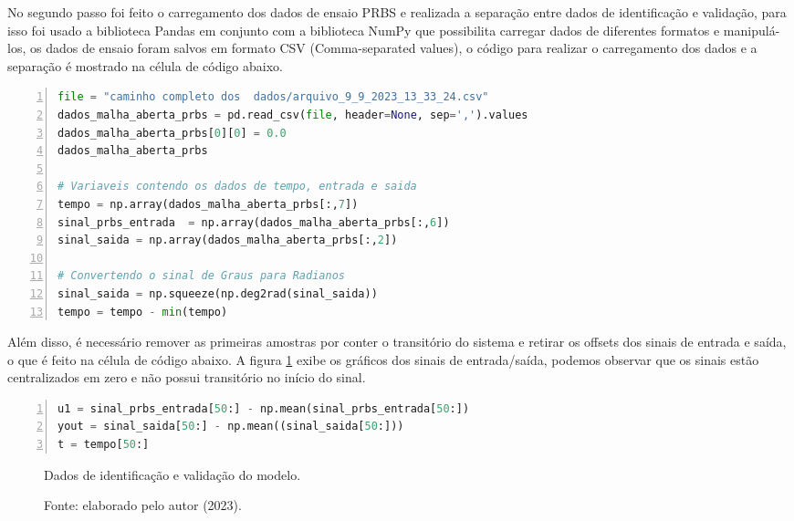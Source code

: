 No segundo passo foi feito o carregamento dos dados de ensaio PRBS e realizada a separação entre dados de identificação e validação, para isso foi usado a biblioteca Pandas em conjunto com a biblioteca NumPy que possibilita carregar dados de diferentes formatos e manipulá-los, os dados de ensaio foram salvos em formato CSV (Comma-separated values), o código para realizar o carregamento dos dados e a separação é mostrado na célula de código abaixo.

\vspace{0.5cm}

\begin{lstlisting}[language=python, numbers=left, label=py4, caption={Carregando os dados do ensaio e realizando pré-processamento.}]
file = "caminho completo dos  dados/arquivo_9_9_2023_13_33_24.csv"
dados_malha_aberta_prbs = pd.read_csv(file, header=None, sep=',').values
dados_malha_aberta_prbs[0][0] = 0.0
dados_malha_aberta_prbs

# Variaveis contendo os dados de tempo, entrada e saida
tempo = np.array(dados_malha_aberta_prbs[:,7])
sinal_prbs_entrada  = np.array(dados_malha_aberta_prbs[:,6])
sinal_saida = np.array(dados_malha_aberta_prbs[:,2])

# Convertendo o sinal de Graus para Radianos
sinal_saida = np.squeeze(np.deg2rad(sinal_saida))
tempo = tempo - min(tempo)
\end{lstlisting}


Além disso, é necessário remover as primeiras amostras por conter o transitório do sistema e retirar os offsets dos sinais de entrada e saída, o que é feito na célula de código abaixo. A figura \ref{fig3:image_20} exibe os gráficos dos sinais de entrada/saída, podemos observar que os sinais estão centralizados em zero e não possui transitório no início do sinal.

\vspace{0.5cm}


\begin{lstlisting}[language=python, numbers=left, label=py3, caption={Centralizando os sinais de entrada e daída em zero.}]
u1 = sinal_prbs_entrada[50:] - np.mean(sinal_prbs_entrada[50:])
yout = sinal_saida[50:] - np.mean((sinal_saida[50:]))
t = tempo[50:]
\end{lstlisting}

\begin{figure}[!h]
	\centering
	\caption{Dados de identificação e validação do modelo.}
	\caption*{Fonte: elaborado pelo autor (2023).}
	\label{fig3:image_20}
\end{figure}

